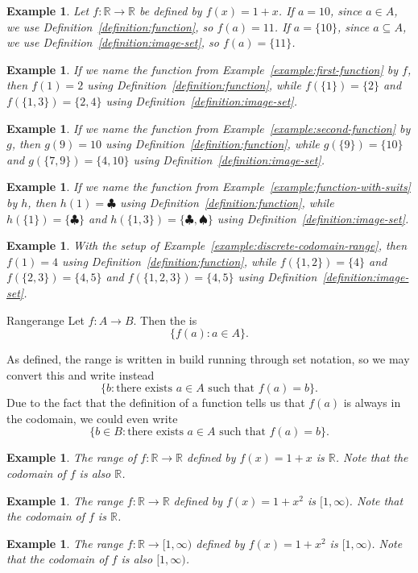 \documentclass{book}
\newcounter{ekcounter}%
\theoremstyle{ekimcustom}
\newtheorem{example}[ekcounter]{Example}
\newcommand\defn[1]{{\color{blue}{\bf #1}}}
\begin{document}
\begin{example}
Let $f : \mathbb{R} \to \mathbb{R}$ be defined by $f(x) = 1 + x$.
If $a = 10$, since $a \in A$, we use Definition~\ref{definition:function}, so $f(a) = 11$.
If $a = \{10\}$, since $a \subseteq A$, we use Definition~\ref{definition:image-set}, so $f(a) = \{11\}$.
\end{example}


\begin{example}
If we name the function from Example~\ref{example:first-function} by $f$,
then $f(1)=2$ using Definition~\ref{definition:function},
while $f(\{1\})=\{2\}$ and $f(\{1,3\})=\{2,4\}$ using Definition~\ref{definition:image-set}.
\end{example}
\begin{example}
If we name the function from Example~\ref{example:second-function} by $g$, 
then $g(9)=10$ using Definition~\ref{definition:function},
while $g(\{9\})=\{10\}$ and $g(\{7,9\})=\{4,10\}$ using Definition~\ref{definition:image-set}.
\end{example}
\begin{example}
If we name the function from Example~\ref{example:function-with-suits} by $h$, 
then $h(1)=\clubsuit$ using Definition~\ref{definition:function},
while $h(\{1\})=\{\clubsuit\}$ and $h(\{1,3\})=\{\clubsuit,\spadesuit\}$ using Definition~\ref{definition:image-set}.
\end{example}
\begin{example}
With the setup of Example~\ref{example:discrete-codomain-range}, 
then $f(1)=4$ using Definition~\ref{definition:function},
while $f(\{1,2\})=\{4\}$ and $f(\{2,3\})=\{4,5\}$ and $f(\{1,2,3\})=\{4,5\}$ using Definition~\ref{definition:image-set}.
\end{example}




\begin{bdefinition}{Range}{range}
Let $f : A \to B$. Then the \defn{range of $f$} is
\[ \{ f(a) : a \in A \}.\]
\end{bdefinition}
As defined, the range is written in build running through set notation, so we may convert this and write instead
\[ \{ b : \text{there exists } a \in A \text{ such that } f(a)=b\}.\]
Due to the fact that the definition of a function tells us that $f(a)$ is always in the codomain, we could even write
\[\{ b \in B : \text{there exists } a \in A \text{ such that } f(a)=b\}.\]

\begin{example}
The range of $f : \mathbb{R} \to \mathbb{R}$ defined by $f(x) = 1 + x$ is $\mathbb{R}$. Note that the codomain of $f$ is also $\mathbb{R}$.
\end{example}
\begin{example}
The range $f : \mathbb{R} \to \mathbb{R}$ defined by $f(x) = 1 + x^2$ is $[1,\infty)$. Note that the codomain of $f$ is $\mathbb{R}$.
\end{example}
\begin{example}
The range $f : \mathbb{R} \to [1,\infty)$ defined by $f(x) = 1 + x^2$ is $[1,\infty)$. Note that the codomain of $f$ is also $[1,\infty)$.
\end{example}
\end{document}
